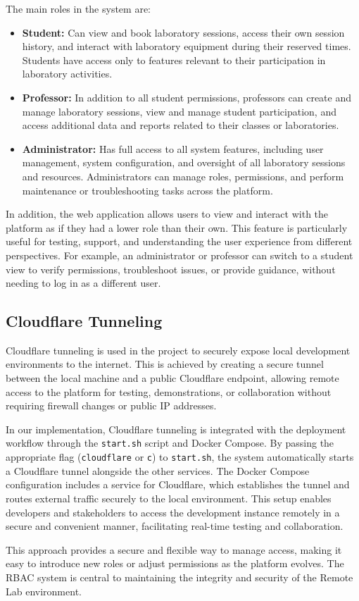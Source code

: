 The main roles in the system are:
\begin{itemize}
    \item \textbf{Student:} Can view and book laboratory sessions, access their own session history, and interact with laboratory equipment during their reserved times. Students have access only to features relevant to their participation in laboratory activities.
    \item \textbf{Professor:} In addition to all student permissions, professors can create and manage laboratory sessions, view and manage student participation, and access additional data and reports related to their classes or laboratories.
    \item \textbf{Administrator:} Has full access to all system features, including user management, system configuration, and oversight of all laboratory sessions and resources. Administrators can manage roles, permissions, and perform maintenance or troubleshooting tasks across the platform.
\end{itemize}

In addition, the web application allows users to view and interact with the platform as if they had a lower role than their own. This feature is particularly useful for testing, support, and understanding the user experience from different perspectives. For example, an administrator or professor can switch to a student view to verify permissions, troubleshoot issues, or provide guidance, without needing to log in as a different user. 

\subsection{Cloudflare Tunneling}

Cloudflare tunneling is used in the project to securely expose local development environments to the internet. This is achieved by creating a secure tunnel between the local machine and a public Cloudflare endpoint, allowing remote access to the platform for testing, demonstrations, or collaboration without requiring firewall changes or public IP addresses.

In our implementation, Cloudflare tunneling is integrated with the deployment workflow through the \texttt{start.sh} script and Docker Compose. By passing the appropriate flag (\texttt{cloudflare} or \texttt{c}) to \texttt{start.sh}, the system automatically starts a Cloudflare tunnel alongside the other services. The Docker Compose configuration includes a service for Cloudflare, which establishes the tunnel and routes external traffic securely to the local environment. This setup enables developers and stakeholders to access the development instance remotely in a secure and convenient manner, facilitating real-time testing and collaboration.

This approach provides a secure and flexible way to manage access, making it easy to introduce new roles or adjust permissions as the platform evolves. The RBAC system is central to maintaining the integrity and security of the Remote Lab environment.
